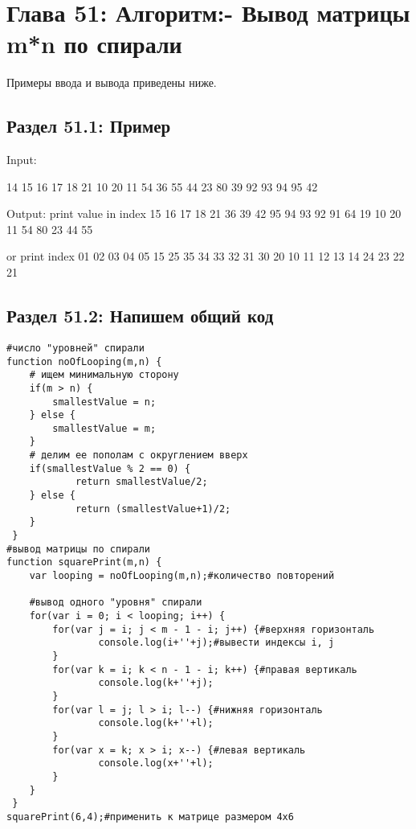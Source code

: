 \chapter*{Глава 51: Алгоритм:- Вывод матрицы m*n по спирали}
Примеры ввода и вывода приведены ниже.
\section*{Раздел 51.1: Пример}
\begin{tcolorbox}
               Input:
               
\vspace{\baselineskip}
14 15 16 17 18 21 10 20 11 54 36 55 44 23 80 39 92 93 94 95 42

\vspace{\baselineskip}
Output:\newline 
print value in index 15 16 17 18 21 36 39 42 95 94 93 92 91 64 19 10 20 11 54 80 23 44 55

\vspace{\baselineskip}
or print index 01 02 03 04 05 15 25 35 34 33 32 31 30 20 10 11 12 13 14 24 23 22 21 
\end{tcolorbox}
\section*{Раздел 51.2: Напишем общий код}
\begin{tcolorbox}\begin{verbatim}
#число "уровней" спирали
function noOfLooping(m,n) {
    # ищем минимальную сторону
    if(m > n) {
        smallestValue = n;
    } else {
        smallestValue = m;
    }
    # делим ее пополам с округлением вверх
    if(smallestValue % 2 == 0) {
            return smallestValue/2;
    } else {
            return (smallestValue+1)/2;
    }
 }
#вывод матрицы по спирали
function squarePrint(m,n) {
    var looping = noOfLooping(m,n);#количество повторений

    #вывод одного "уровня" спирали
    for(var i = 0; i < looping; i++) {
        for(var j = i; j < m - 1 - i; j++) {#верхняя горизонталь
                console.log(i+''+j);#вывести индексы i, j
        }
        for(var k = i; k < n - 1 - i; k++) {#правая вертикаль
                console.log(k+''+j);
        }
        for(var l = j; l > i; l--) {#нижняя горизонталь
                console.log(k+''+l);
        }
        for(var x = k; x > i; x--) {#левая вертикаль
                console.log(x+''+l);
        }
    }
 }
squarePrint(6,4);#применить к матрице размером 4x6

\end{verbatim}
\end{tcolorbox}
